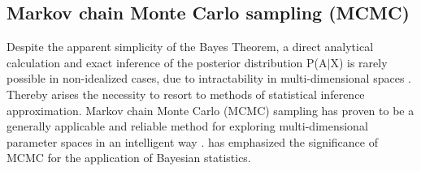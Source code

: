         \subsection{Markov chain Monte Carlo sampling (MCMC)}\label{sec:mcmc}
        Despite the apparent simplicity of the Bayes Theorem, a direct analytical calculation and exact inference of the posterior distribution P(A$|$X) is rarely possible in non-idealized cases, due to intractability in multi-dimensional spaces \citep{hoffman2014no, delaVarga2016}. Thereby arises the necessity to resort to methods of statistical inference approximation. Markov chain Monte Carlo (MCMC) sampling has proven to be a generally applicable and reliable method for exploring multi-dimensional parameter spaces in an intelligent way \citep{hoffman2014no, davidson2015}. \citet{gilks2005markov} has emphasized the significance of MCMC for the application of Bayesian statistics.
        
